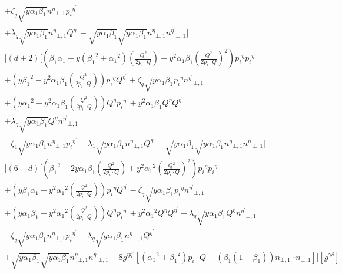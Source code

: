 \begin{equation}
\begin{split}
+\zeta_q\sqrt{y\alpha_1\beta_1} {n^{{\eta}}}_{\bot,1}{p_i}^{{\eta}^{\prime}}\\+\lambda_q\sqrt{y\alpha_1\beta_1}{n^{{\eta}}}_{\bot,1}{Q}^{{\eta}^{\prime}}-\sqrt{y\alpha_1\beta_1}\sqrt{y\alpha_1\beta_1}{n^{{\eta}}}_{\bot,1}{n^{{\eta}^{\prime}}}_{\bot,1}]\\
[(d+2)[(\beta_1\alpha_1-y({\beta_1}^2+{\alpha_1}^2)(\frac{Q^2}{2p_i \cdot Q})+y^2\alpha_1\beta_1 (\frac{Q^2}{2p_i \cdot Q})^2) {p_i}^{\eta}{p_i}^{{\eta}^{\prime}}\\+(y{\beta_1}^2 -y^2\alpha_1 \beta_1(\frac{Q^2}{2p_i \cdot Q})){p_i}^{\eta}{Q}^{{\eta}^{\prime}}+\zeta_q\sqrt{y\alpha_1\beta_1}{p_i}^{\eta}{n^{{\eta}^{\prime}}}_{\bot,1}\\
+(y{\alpha_1}^2 -y^2\alpha_1\beta_1(\frac{Q^2}{2p_i \cdot Q})) {Q}^{\eta}{p_i}^{{\eta}^{\prime}}+y^2\alpha_1\beta_1{Q}^{\eta}{Q}^{{\eta}^{\prime}}\\+\lambda_q\sqrt{y\alpha_1\beta_1}{Q}^{\eta}{n^{{\eta}^{\prime}}}_{\bot,1}\\
-\zeta_1\sqrt{y\alpha_1\beta_1} {n^{{\eta}}}_{\bot,1}{p_i}^{{\eta}^{\prime}}-\lambda_1\sqrt{y\alpha_1\beta_1}{n^{{\eta}}}_{\bot,1}{Q}^{{\eta}^{\prime}}-\sqrt{y\alpha_1\beta_1}\sqrt{y\alpha_1\beta_1}{n^{{\eta}}}_{\bot,1}{n^{{\eta}^{\prime}}}_{\bot,1}]\\
[(6-d)[({\beta_1}^2 -2y\alpha_1\beta_1 (\frac{Q^2}{2p_i \cdot Q})+ y^2{\alpha_1}^2 (\frac{Q^2}{2p_i \cdot Q})^2) {p_i}^{\eta}{p_i}^{{\eta}^{\prime}}\\+(y\beta_1\alpha_1 -y^2{\alpha_1}^2(\frac{Q^2}{2p_i \cdot Q})){p_i}^{\eta}{Q}^{{\eta}^{\prime}}-\zeta_q\sqrt{y\alpha_1\beta_1}{p_i}^{\eta}{n^{{\eta}^{\prime}}}_{\bot,1}\\
+(y\alpha_1\beta_1 -y^2{\alpha_1}^2 (\frac{Q^2}{2p_i \cdot Q})) {Q}^{\eta}{p_i}^{{\eta}^{\prime}}+y^2{\alpha_1}^2{Q}^{\eta}{Q}^{{\eta}^{\prime}}-\lambda_q\sqrt{y\alpha_1\beta_1}{Q}^{\eta}{n^{{\eta}^{\prime}}}_{\bot,1}\\
-\zeta_q\sqrt{y\alpha_1\beta_1} {n^{{\eta}}}_{\bot,1}{p_i}^{{\eta}^{\prime}}-\lambda_q\sqrt{y\alpha_1\beta_1}{n^{{\eta}}}_{\bot,1}{Q}^{{\eta}^{\prime}}\\+\sqrt{y\alpha_1\beta_1}\sqrt{y\alpha_1\beta_1}{n^{{\eta}}}_{\bot,1}{n^{{\eta}^{\prime}}}_{\bot,1}-8g^{{\eta}{{\eta}^{\prime}}}[({\alpha_1}^2+{\beta_1}^2) p_i \cdot Q - ({\beta_1}(1-\beta_1)){n}_{\bot,1}\cdot{n}_{\bot,1}]][g^{{\gamma}{{\delta}}}]
\end{split}
\end{equation}


